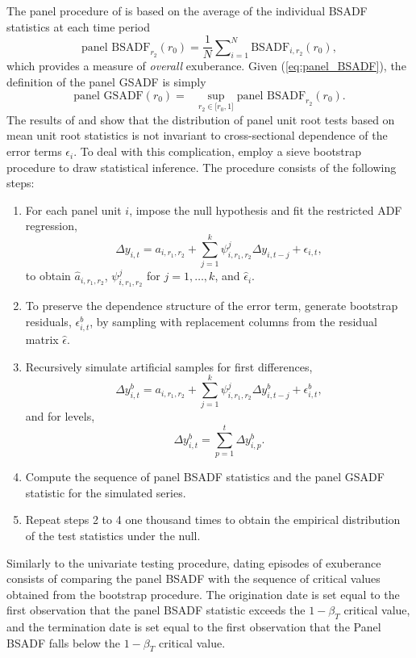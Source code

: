 \documentclass[11pt]{article}
\begin{document}
\begin{appendix}
The panel procedure of \citet{pavlidis2016} is based on the average of the individual BSADF statistics at each time period
\begin{equation}\label{eq:panel_BSADF}
\text{panel BSADF}_{r_{2}}(r_{0})=\frac{1}{N}%
{\displaystyle\sum\nolimits_{i=1}^{N}}
\text{BSADF}_{i,r_{2}}(r_{0}),
\end{equation}
which provides a measure of \textit{overall} exuberance. Given (\ref{eq:panel_BSADF}), the definition of the panel GSADF is simply
\begin{equation}
\text{panel GSADF}\left(r_{0}\right)  =\text{ }\sup_{r_{2}\in\lbrack
r_{0},1]}\text{panel BSADF}_{r_{2}}(r_{0}).
\end{equation}
The results of \citet{maddala1999} and \citet{chang2004} show that the distribution of panel unit root tests based on mean unit root statistics is not invariant to cross-sectional dependence of the error terms $\epsilon_{i}$. To deal with this complication, \citet{pavlidis2016} employ a sieve bootstrap procedure to draw statistical inference. The procedure consists of the following steps:
\begin{enumerate}
\item{} For each panel unit $i$, impose the null hypothesis and fit the restricted ADF regression,
\[
\Delta y_{i,t}=a_{i,r_{1},r_{2}}+
{\sum_{j=1}^{k}}\psi_{i,r_{1},r_{2}}^{j}\Delta y_{i,t-j}+\epsilon_{i,t},
\]
to obtain $\hat{a}_{i,r_1,r_2}$, $\psi_{i,r_1,r_2}^j$ for $j=1,\dots,k$, and $\hat{\epsilon}_{i}$.
\item{} To preserve the dependence structure of the error term, generate bootstrap residuals, $\epsilon_{i,t}^b$, by sampling with replacement  columns from the residual matrix $\hat{\epsilon}$. 
\item{} Recursively simulate artificial samples for first differences,
\[
\Delta y_{i,t}^b=a_{i,r_{1},r_{2}}+
{\sum_{j=1}^{k}}\psi_{i,r_{1},r_{2}}^{j}\Delta y_{i,t-j}^b+\epsilon_{i,t}^b,
\]
and for levels,
\[
\Delta y_{i,t}^b=\sum_{p=1}^t \Delta y_{i,p}^b.
\]
\item{} Compute the sequence of panel BSADF statistics and the panel GSADF statistic for the simulated series.
\item{} Repeat steps 2 to 4 one thousand times to obtain the empirical distribution of the test statistics under the null. 
\end{enumerate}

 
Similarly to the univariate testing procedure, dating episodes of  exuberance consists of comparing the panel BSADF with the sequence of critical values obtained from the bootstrap procedure. The origination date is set equal to the first observation that the panel BSADF statistic exceeds the $1-\beta_T$ critical value, and the termination date is set equal to the first observation that the Panel BSADF falls below the $1-\beta_T$ critical value.


\end{appendix}
\end{document}

